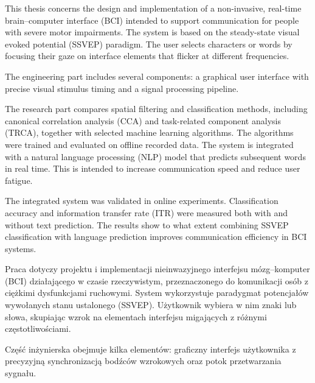 \begin{abstracts}

  \AbstractENG

  This thesis concerns the design and implementation of a non-invasive, real-time
  brain–computer interface (BCI) intended to support communication for people with severe
  motor impairments. The system is based on the steady-state visual evoked potential
  (SSVEP) paradigm. The user selects characters or words by focusing their gaze on
  interface elements that flicker at different frequencies.

  The engineering part includes several components: a graphical user interface with
  precise visual stimulus timing and a signal processing pipeline.

  The research part compares spatial filtering and classification methods, including
  canonical correlation analysis (CCA) and task-related component analysis (TRCA),
  together with selected machine learning algorithms. The algorithms were trained and
  evaluated on offline recorded data. The system is integrated with a natural language
  processing (NLP) model that predicts subsequent words in real time. This is intended to
  increase communication speed and reduce user fatigue.

  The integrated system was validated in online experiments. Classification accuracy and
  information transfer rate (ITR) were measured both with and without text prediction. The
  results show to what extent combining SSVEP classification with language prediction
  improves communication efficiency in BCI systems.

  \AbstractPL

  Praca dotyczy projektu i implementacji nieinwazyjnego interfejsu mózg–komputer (BCI)
  działającego w czasie rzeczywistym, przeznaczonego do komunikacji osób z ciężkimi
  dysfunkcjami ruchowymi. System wykorzystuje paradygmat potencjałów wywołanych stanu
  ustalonego (SSVEP). Użytkownik wybiera w nim znaki lub słowa, skupiając wzrok na
  elementach interfejsu migających z różnymi częstotliwościami.

  Część inżynierska obejmuje kilka elementów: graficzny interfejs użytkownika z precyzyjną
  synchronizacją bodźców wzrokowych oraz potok przetwarzania sygnału.


\end{abstracts}
